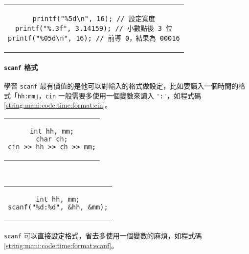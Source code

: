 \documentclass[12pt,a4paper,oneside]{report}
\begin{document}
\begin{CJK}{UTF8}{bkai}
\begin{code}
  \centering
  \begin{tabular}{c}
  \begin{lstlisting}
printf("%5d\n", 16); // 設定寬度
printf("%.3f", 3.14159); // 小數點後 3 位
printf("%05d\n", 16); // 前導 0，結果為 00016
  \end{lstlisting}
  \end{tabular}
  \caption{\lstinline!printf! 格式範例}
  \label{string:mani:code:printf:format}
\end{code}

\paragraph{\lstinline!scanf! 格式}學習 \lstinline!scanf! 最有價值的是他可以對輸入的格式做設定，比如要讀入一個時間的格式「\lstinline!hh:mm!」，\lstinline!cin! 一般需要多使用一個變數來讀入 \lstinline!':'!，如程式碼 \ref{string:mani:code:time:format:cin}。

\begin{code}[h!]
  \centering
  \begin{subcode}{.43\textwidth}
    \centering
    \begin{tabular}{c}
    \begin{lstlisting}
int hh, mm;
char ch;
cin >> hh >> ch >> mm;
    \end{lstlisting}
    \end{tabular}
    \caption{用 \lstinline!cin! 輸入}
    \label{string:mani:code:time:format:cin}
  \end{subcode}
  ~
  \begin{subcode}{.33\textwidth}
    \centering
    \begin{tabular}{c}
    \begin{lstlisting}
int hh, mm;
scanf("%d:%d", &hh, &mm);
    \end{lstlisting}
    \end{tabular}
    \caption{用 \lstinline!scanf! 輸入}
    \label{string:mani:code:time:format:scanf}
  \end{subcode}
  \caption{比較 \lstinline!cin! 與 \lstinline!scanf! 差異}
  \label{string:mani:code:time:format}
\end{code}

\paragraph{}\lstinline!scanf! 可以直接設定格式，省去多使用一個變數的麻煩，如程式碼 \ref{string:mani:code:time:format:scanf}。


\end{CJK}
\end{document}
